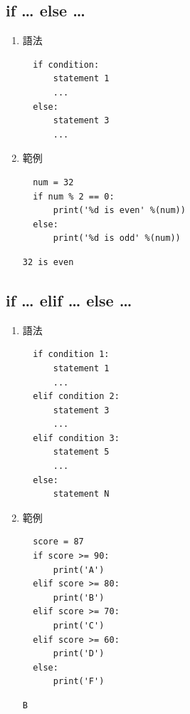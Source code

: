 \documentclass[a4paper,12pt]{article}
\begin{document}
\subsection{if \ldots{} else \ldots{}}
\label{sec:org8625688}
\begin{enumerate}
\item 語法
\label{sec:org11a5bae}
\lstset{breaklines=true,language=Python,label= ,caption= ,captionpos=b,firstnumber=1,numbers=left}
\begin{lstlisting}
  if condition:
      statement 1
      ...
  else:
      statement 3
      ...
\end{lstlisting}

\item 範例
\label{sec:org379ffb9}
\lstset{breaklines=true,language=Python,label= ,caption= ,captionpos=b,firstnumber=1,numbers=left}
\begin{lstlisting}
  num = 32
  if num % 2 == 0:
      print('%d is even' %(num))
  else:
      print('%d is odd' %(num))
\end{lstlisting}

\begin{verbatim}
32 is even
\end{verbatim}
\end{enumerate}

\subsection{if \ldots{} elif \ldots{} else \ldots{}}
\label{sec:orgbfc8db2}
\begin{enumerate}
\item 語法
\label{sec:orga0194ac}
\lstset{breaklines=true,language=Python,label= ,caption= ,captionpos=b,firstnumber=1,numbers=left}
\begin{lstlisting}
  if condition 1:
      statement 1
      ...
  elif condition 2:
      statement 3
      ...
  elif condition 3:
      statement 5
      ...
  else:
      statement N
\end{lstlisting}

\item 範例
\label{sec:org8ba4547}
\lstset{breaklines=true,language=Python,label= ,caption= ,captionpos=b,firstnumber=1,numbers=left}
\begin{lstlisting}
  score = 87
  if score >= 90:
      print('A')
  elif score >= 80:
      print('B')
  elif score >= 70:
      print('C')
  elif score >= 60:
      print('D')
  else:
      print('F')
\end{lstlisting}

\begin{verbatim}
B
\end{verbatim}
\end{enumerate}
\end{document}
